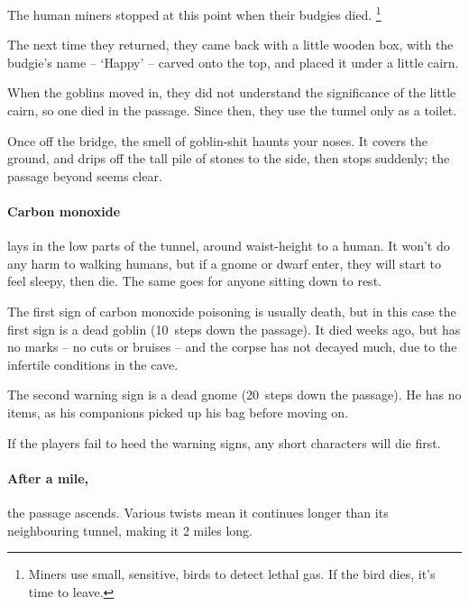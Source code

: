 \begin{multicols}{2}



\begin{exampletext}
  The human miners stopped at this point when their budgies died.%
  \footnote{Miners use small, sensitive, birds to detect lethal gas.  If the bird dies, it's time to leave.}

  The next time they returned, they came back with a little wooden box, with the budgie's name -- `Happy' -- carved onto the top, and placed it under a little cairn.

  When the goblins moved in, they did not understand the significance of the little cairn, so one died in the passage.
  Since then, they use the tunnel only as a toilet.
\end{exampletext}

\begin{boxtext}
  Once off the bridge, the smell of goblin-shit haunts your noses.
  It covers the ground, and drips off the tall pile of stones to the side, then stops suddenly; the passage beyond seems clear.
\end{boxtext}

\paragraph{Carbon monoxide}
lays in the low parts of the tunnel, around waist-height to a human.
It won't do any harm to walking humans, but if a gnome or dwarf enter, they will start to feel sleepy, then die.
The same goes for anyone sitting down to rest.

The first sign of carbon monoxide poisoning is usually death, but in this case the first sign is a dead goblin (10~\glspl{step} down the passage).
It died weeks ago, but has no marks -- no cuts or bruises -- and the corpse has not decayed much, due to the infertile conditions in the cave.

The second warning sign is a dead gnome (20~\glspl{step} down the passage).
He has no items, as his companions picked up his bag before moving on.

If the players fail to heed the warning signs, any short characters will die first.

\paragraph{After a mile,}
the passage ascends.
Various twists mean it continues longer than its neighbouring tunnel, making it 2 miles long.


\end{multicols}
